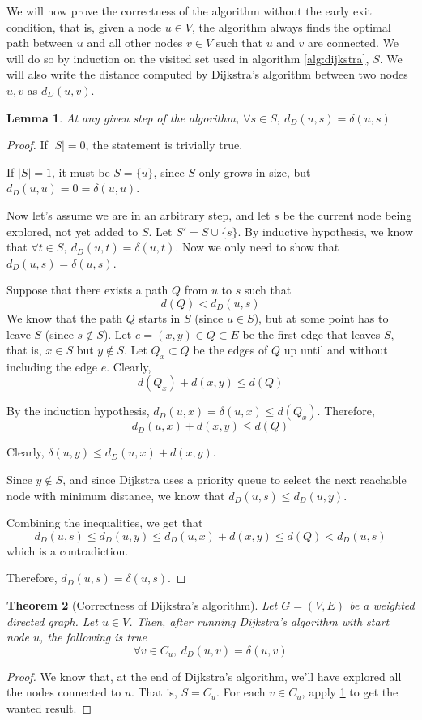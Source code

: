 \documentclass[12pt]{report}
\newtheorem{theorem}{Theorem}[chapter]
\newtheorem{lemma}[theorem]{Lemma}
\begin{document}
We will now prove the correctness of the algorithm without the early exit condition, that is, given a node $u \in V$, the algorithm always finds the optimal path between $u$ and all other nodes $v \in V$ such that $u$ and $v$ are connected. We will do so by induction on the visited set used in algorithm \ref{alg:dijkstra}, $S$. We will also write the distance computed by Dijkstra's algorithm between two nodes $u, v$ as $d_D(u, v)$.

\begin{lemma}
\label{lemma:dijkstra}
At any given step of the algorithm, $\forall s \in S,\ d_D(u, s) = \delta(u, s)$
\end{lemma}
\begin{proof}
If $|S| = 0$, the statement is trivially true.

If $|S| = 1$, it must be $S = \{u\}$, since $S$ only grows in size, but $d_D(u, u) = 0 = \delta(u, u)$.

Now let's assume we are in an arbitrary step, and let $s$ be the current node being explored, not yet added to $S$. Let $S' = S \cup \{s\}$. By inductive hypothesis, we know that $\forall t \in S,\ d_D(u, t) = \delta(u, t)$. Now we only need to show that $d_D(u, s) = \delta(u, s)$.

Suppose that there exists a path $Q$ from $u$ to $s$ such that
\[d(Q) < d_D(u, s)\]
We know that the path $Q$ starts in $S$ (since $u \in S$), but at some point has to leave $S$ (since $s \not\in S$). Let $e = (x, y) \in Q \subset E$ be the first edge that leaves $S$, that is, $x \in S$ but $y \not\in S$. Let $Q_x \subset Q$ be the edges of $Q$ up until and without including the edge $e$. Clearly,
\[d(Q_x) + d(x, y) \le d(Q)\]

By the induction hypothesis, $d_D(u, x) = \delta(u, x) \le d(Q_x)$. Therefore,
\[ d_D(u, x) + d(x, y) \le d(Q) \]

Clearly, $\delta(u, y) \le d_D(u, x) + d(x, y)$.

Since $y \not\in S$, and since Dijkstra uses a priority queue to select the next reachable node with minimum distance, we know that $d_D(u, s) \le d_D(u, y)$.

Combining the inequalities, we get that
\[ d_D(u, s) \le d_D(u, y) \le d_D(u, x) + d(x, y) \le d(Q) < d_D(u, s) \]
which is a contradiction.

Therefore, $d_D(u, s) = \delta(u, s)$.
\end{proof}

\begin{theorem}[Correctness of Dijkstra's algorithm]
\label{thm:dijkstra}
Let $G = (V, E)$ be a weighted directed graph. Let $u \in V$. Then, after running Dijkstra's algorithm with start node $u$, the following is true
\[ \forall v \in C_u,\  d_D(u, v) = \delta(u, v) \]
\end{theorem}
\begin{proof}
We know that, at the end of Dijkstra's algorithm, we'll have explored all the nodes connected to $u$. That is, $S = C_u$. For each $v \in C_u$, apply \ref{lemma:dijkstra} to get the wanted result.
\end{proof}
\end{document}
